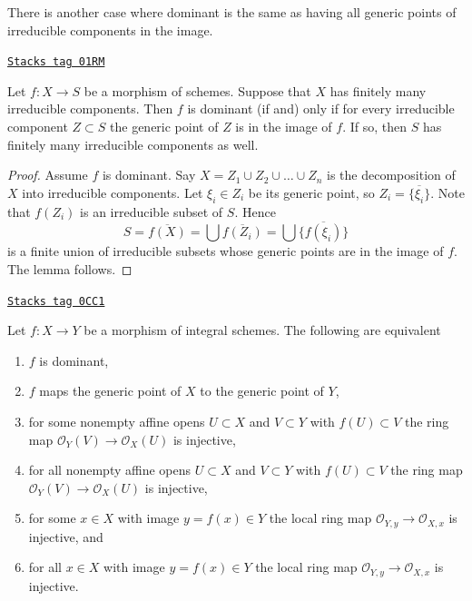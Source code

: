 There is another case where dominant is the same as having all
generic points of irreducible components in the image.

\begin{lemma}
\label{morphisms-lemma-dominant-finite-number-irreducible-components}
\href{https://stacks.math.columbia.edu/tag/01RM}{\texttt{Stacks tag 01RM}}

Let $f : X \to S$ be a morphism of schemes.
Suppose that $X$ has finitely many irreducible components.
Then $f$ is dominant (if and) only if for every irreducible
component $Z \subset S$ the generic point of $Z$ is in the
image of $f$. If so, then $S$ has finitely many irreducible
components as well.
\end{lemma}

\begin{proof}
Assume $f$ is dominant.
Say $X = Z_1 \cup Z_2 \cup \ldots \cup Z_n$ is the decomposition
of $X$ into irreducible components. Let $\xi_i \in Z_i$ be
its generic point, so $Z_i = \overline{\{\xi_i\}}$.
Note that $f(Z_i)$ is an irreducible subset of $S$.
Hence
$$
S = \overline{f(X)} = \bigcup \overline{f(Z_i)} =
\bigcup \overline{\{f(\xi_i)\}}
$$
is a finite union of irreducible subsets whose generic
points are in the image of $f$. The lemma follows.
\end{proof}

\begin{lemma}
\label{morphisms-lemma-dominant-between-integral}
\href{https://stacks.math.columbia.edu/tag/0CC1}{\texttt{Stacks tag 0CC1}}

Let $f : X \to Y$ be a morphism of integral schemes. The following
are equivalent
\begin{enumerate}
\item $f$ is dominant,
\item $f$ maps the generic point of $X$ to the generic point of $Y$,
\item for some nonempty affine opens $U \subset X$ and $V \subset Y$
with $f(U) \subset V$ the ring map $\mathcal{O}_Y(V) \to \mathcal{O}_X(U)$
is injective,
\item for all nonempty affine opens $U \subset X$ and $V \subset Y$
with $f(U) \subset V$ the ring map $\mathcal{O}_Y(V) \to \mathcal{O}_X(U)$
is injective,
\item for some $x \in X$ with image $y = f(x) \in Y$ the local ring
map $\mathcal{O}_{Y, y} \to \mathcal{O}_{X, x}$ is injective, and
\item for all $x \in X$ with image $y = f(x) \in Y$ the local ring
map $\mathcal{O}_{Y, y} \to \mathcal{O}_{X, x}$ is injective.
\end{enumerate}
\end{lemma}

